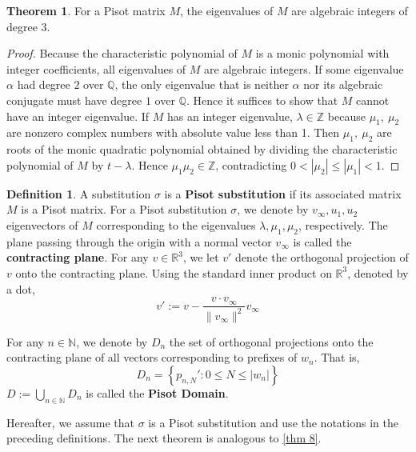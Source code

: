 \documentclass{article}
\theoremstyle{definition}
\newtheorem{theorem}{Theorem}
\newtheorem*{definition}{Definition}
\begin{document}
\begin{theorem}
\label{p2}
For a Pisot matrix $M$, the eigenvalues of $M$ are algebraic integers of degree $3$.
\end{theorem}
\begin{proof}
Because the characteristic polynomial of $M$ is a monic polynomial with integer coefficients, all eigenvalues of $M$ are algebraic integers. If some eigenvalue $\alpha$ had degree $2$ over $\mathbb{Q}$, the only eigenvalue that is neither $\alpha$ nor its algebraic conjugate must have degree $1$ over $\mathbb{Q}$. Hence it suffices to show that $M$ cannot have an integer eigenvalue.
If $M$ has an integer eigenvalue, $\lambda\in\mathbb{Z}$ because $\mu_1, \ \mu_2$ are nonzero complex numbers with absolute value less than 1. Then $\mu_1, \ \mu_2$ are roots of the monic quadratic polynomial obtained by dividing the characteristic polynomial of $M$ by $t-\lambda$. Hence $\mu_1\mu_2\in\mathbb{Z}$, contradicting $0<|\mu_2|\leq|\mu_1|<1$.
\end{proof}

\begin{definition}
A substitution $\sigma$ is a \textbf{Pisot substitution} if its associated matrix $M$ is a Pisot matrix. For a Pisot substitution $\sigma$, we denote by $v_\infty, u_1, u_2$ eigenvectors of $M$ corresponding to the eigenvalues $\lambda, \mu_1, \mu_2$, respectively. The plane passing through the origin with a normal vector $v_\infty$ is called the \textbf{contracting plane}. For any $v\in\mathbb{R}^3$, we let $v'$ denote the orthogonal projection of $v$ onto the contracting plane. Using the standard inner product on $\mathbb{R}^3$, denoted by a dot, \[v':=v-\frac{v\cdot v_\infty}{\|v_\infty \|^2}v_\infty\]

For any $n\in\mathbb{N}$, we denote by $D_n$ the set of orthogonal projections onto the contracting plane of all vectors corresponding to prefixes of $w_n$. That is,
\[
D_n=\left\{p_{n,N}': 0\leq N\leq|w_n| \right\}
\]
$D:=\bigcup_{n\in\mathbb{N}}D_n$ is called the \textbf{Pisot Domain}.
\end{definition}

Hereafter, we assume that $\sigma$ is a Pisot substitution and use the notations in the preceding definitions. The next theorem is analogous to \cref{thm 8}.
\end{document}
